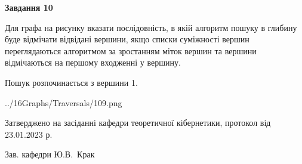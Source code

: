 \documentclass[12pt, ukrainian]{article}
\begin{document}
{\begin {large}
{\begin {center}\textbf{Завдання 10}\end {center}}\par
Для графа на рисунку вказати послідовність, в якій алгоритм пошуку в глибину буде відмічати відвідані вершини, якщо списки суміжності вершин переглядаються алгоритмом за зростанням міток вершин та вершини відмічаються на першому вход\-женні у вершину.\par
Пошук розпочинається з вершини 1.\par

\begin{center}
	{../16Graphs/Traversals/109.png}
\end{center}\par
\newpage


\end {large}
}
{\smallskip \begin {small} Затверджено на засіданні кафедри теоретичної кібернетики, протокол  від   23.01.2023 р.\par\smallskip\smallskip
{\parbox {6.5 cm}{Зав. кафедри \dotfill Ю.В.~Крак}} \end{small}}
\end{document}
